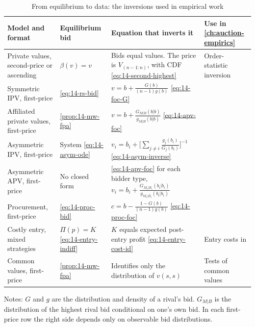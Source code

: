 \begin{table}[htbp]
\centering
\caption{From equilibrium to data: the inversions used in empirical work}
\label{tab:14-model-to-data}
\footnotesize
\begin{tabularx}{\textwidth}{@{}>{\raggedright\arraybackslash}p{}>{\raggedright\arraybackslash}p{}>{\raggedright\arraybackslash}X>{\raggedright\arraybackslash}p{}@{}}
\toprule
Model and format & Equilibrium bid & Equation that inverts it & Use in \cref{ch:auction-empirics} \\
\midrule
Private values, second-price or ascending & $\beta(v)=v$ & Bids equal values. The price is
$V_{(n-1:n)}$, with CDF \eqref{eq:14-second-highest} & Order-statistic inversion \\[3pt]
Symmetric IPV, first-price & \eqref{eq:14-rs-bid} & $v=b+\frac{G(b)}{(n-1)g(b)}$
\eqref{eq:14-foc-G} & \citet{GuerrePerrigneVuong2000} \\[3pt]
Affiliated private values, first-price & \cref{prop:14-mw-fpa} & $v=b+\frac{G_{M|B}(b|b)}{g_{M|B}(b|b)}$
\eqref{eq:14-apv-foc} & \citet{LiPerrigneVuong2002} \\[3pt]
Asymmetric IPV, first-price & System \eqref{eq:14-asym-ode} & $v_i=b_i+\bigl[\sum_{j\neq
i}\frac{g_j(b_i)}{G_j(b_i)}\bigr]^{-1}$ \eqref{eq:14-asym-inverse} & \citet{AtheyLevinSeira2011} \\[3pt]
Asymmetric APV, first-price & No closed form & \eqref{eq:14-apv-foc} for each bidder type,
$v_i=b_i+\frac{G_{M_i|B_i}(b_i|b_i)}{g_{M_i|B_i}(b_i|b_i)}$ & \citet{CampoPerrigneVuong2003} \\[3pt]
Procurement, first-price & \eqref{eq:14-proc-bid} & $c=b-\frac{1-G(b)}{(n-1)g(b)}$
\eqref{eq:14-proc-foc} & \citet{Krasnokutskaya2011} \\[3pt]
Costly entry, mixed strategies & $\Pi(p)=K$ \eqref{eq:14-entry-indiff} & $K$ equals expected
post-entry profit \eqref{eq:14-entry-cost-id} & Entry costs in \citet{AtheyLevinSeira2011} \\[3pt]
Common values, first-price & \cref{prop:14-mw-fpa} & Identifies only the distribution of $v(s,s)$ &
Tests of common values \\
\bottomrule
\end{tabularx}
\par\smallskip
\parbox{\textwidth}{\footnotesize Notes: $G$ and $g$ are the distribution and density of a rival's
bid. $G_{M|B}$ is the distribution of the highest rival bid conditional on one's own bid. In each
first-price row the right side depends only on observable bid distributions.}
\end{table}

